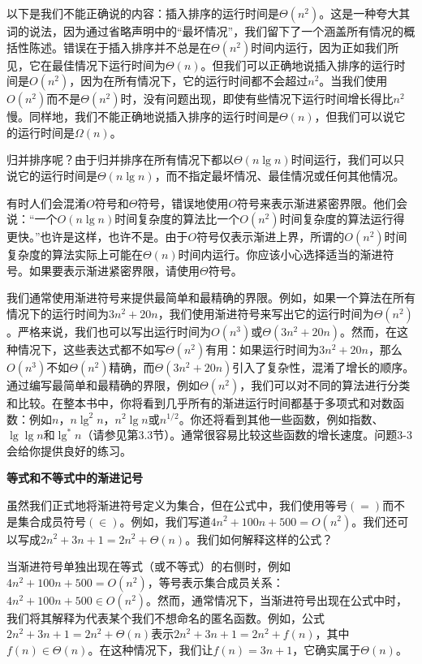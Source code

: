 \documentclass[lang=cn,newtx,10pt,scheme=chinese]{elegantbook}
\begin{document}
以下是我们不能正确说的内容：插入排序的运行时间是$\Theta\left(n^2\right)$。这是一种夸大其词的说法，因为通过省略声明中的“最坏情况”，我们留下了一个涵盖所有情况的概括性陈述。错误在于插入排序并不总是在$\Theta\left(n^2\right)$时间内运行，因为正如我们所见，它在最佳情况下运行时间为$\Theta(n)$。但我们可以正确地说插入排序的运行时间是$O\left(n^2\right)$，因为在所有情况下，它的运行时间都不会超过$n^2$。当我们使用$O\left(n^2\right)$而不是$\Theta\left(n^2\right)$时，没有问题出现，即使有些情况下运行时间增长得比$n^2$慢。同样地，我们不能正确地说插入排序的运行时间是$\Theta(n)$，但我们可以说它的运行时间是$\Omega(n)$。

归并排序呢？由于归并排序在所有情况下都以$\Theta(n\lg n)$时间运行，我们可以只说它的运行时间是$\Theta(n\lg n)$，而不指定最坏情况、最佳情况或任何其他情况。

有时人们会混淆$O$符号和$\Theta$符号，错误地使用$O$符号来表示渐进紧密界限。他们会说：“一个$O(n\lg n)$时间复杂度的算法比一个$O\left(n^2\right)$时间复杂度的算法运行得更快。”也许是这样，也许不是。由于$O$符号仅表示渐进上界，所谓的$O\left(n^2\right)$时间复杂度的算法实际上可能在$\Theta(n)$时间内运行。你应该小心选择适当的渐进符号。如果要表示渐进紧密界限，请使用$\Theta$符号。

我们通常使用渐进符号来提供最简单和最精确的界限。例如，如果一个算法在所有情况下的运行时间为$3n^2+20n$，我们使用渐进符号来写出它的运行时间为$\Theta\left(n^2\right)$。严格来说，我们也可以写出运行时间为$O\left(n^3\right)$或$\Theta\left(3n^2+20n\right)$。然而，在这种情况下，这些表达式都不如写$\Theta\left(n^2\right)$有用：如果运行时间为$3n^2+20n$，那么$O\left(n^3\right)$不如$\Theta\left(n^2\right)$精确，而$\Theta\left(3n^2+20n\right)$引入了复杂性，混淆了增长的顺序。通过编写最简单和最精确的界限，例如$\Theta\left(n^2\right)$，我们可以对不同的算法进行分类和比较。在整本书中，你将看到几乎所有的渐进运行时间都基于多项式和对数函数：例如$n，n \lg ^2 n，n^2 \lg n$或$n^{1 / 2}$。你还将看到其他一些函数，例如指数、$\lg \lg n$和$\lg ^* n$（请参见第3.3节）。通常很容易比较这些函数的增长速度。问题3-3会给你提供良好的练习。

\textbf{等式和不等式中的渐进记号}

虽然我们正式地将渐进符号定义为集合，但在公式中，我们使用等号$(=)$而不是集合成员符号$(\in)$。例如，我们写道$4n^2+100n+500=O\left(n^2\right)$。我们还可以写成$2n^2+3n+1=2n^2+\Theta(n)$。我们如何解释这样的公式？

当渐进符号单独出现在等式（或不等式）的右侧时，例如$4n^2+100n+500=O\left(n^2\right)$，等号表示集合成员关系：$4n^2+100n+500 \in O\left(n^2\right)$。然而，通常情况下，当渐进符号出现在公式中时，我们将其解释为代表某个我们不想命名的匿名函数。例如，公式$2n^2+3n+1=2n^2+\Theta(n)$表示$2n^2+3n+1=2n^2+f(n)$，其中$f(n) \in \Theta(n)$。在这种情况下，我们让$f(n)=3n+1$，它确实属于$\Theta(n)$。
\end{document}
